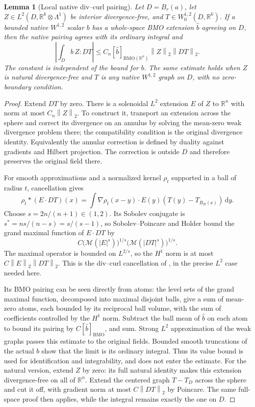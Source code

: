 \documentclass[11pt,a4paper]{article}
\numberwithin{equation}{section}
\newtheorem{lemma}[theorem]{Lemma}
\theoremstyle{definition}
\theoremstyle{remark}
\newcommand{\R}{\mathbb R}
\newcommand{\dd}{\,\mathrm d}
\newcommand{\BMO}{\mathrm{BMO}}
\newcommand{\norm}[1]{\left\lVert#1\right\rVert}
\begin{document}
\begin{lemma}[Local native div--curl pairing]\label{lem:divcurl}
Let $D=B_r(a)$, let $Z\in L^2(D,\R^k\otimes\Lambda^1)$ be
interior divergence-free, and $T\in W^{1,2}_0(D,\R^k)$.
If a bounded native $W^{1,2}$ scalar $b$ has a whole-space BMO extension
$\widehat b$ agreeing on $D$, then the native pairing agrees with its
ordinary integral and
\begin{equation}\label{eq:clms}
 \left|\int_D b\,Z:DT\right|
 \leq C_n[\widehat b]_{\BMO(\R^n)}\norm Z_2\norm{DT}_2.
\end{equation}
The constant is independent of the bound for $b$.
The same estimate holds when $Z$ is natural divergence-free and $T$
is any native $W^{1,2}$ graph on $D$, with no zero-boundary condition.
\end{lemma}
\begin{proof}
Extend $DT$ by zero. There is a solenoidal $L^2$ extension $E$ of $Z$
to $\R^n$ with norm at most $C_n\norm Z_2$. To construct it,
transport an extension across the sphere and correct its divergence on
an annulus by solving the mean-zero weak divergence problem there;
the compatibility condition is the original divergence identity.
Equivalently the annular correction is defined by duality against
gradients and Hilbert projection. The correction is outside $D$ and
therefore preserves the original field there.

For smooth approximations and a normalized kernel $\rho_t$ supported
in a ball of radius $t$, cancellation gives
\[
 \rho_t*(E\cdot DT)(x)
 =\int \nabla\rho_t(x-y)\cdot E(y)
                    (T(y)-T_{B_{2t}(x)})\dd y.
\]
Choose $s=2n/(n+1)\in(1,2)$. Its Sobolev conjugate is
$s^*=ns/(n-s)=s/(s-1)$, so Sobolev--Poincare and Holder bound the grand
maximal function of $E\cdot DT$ by
\[
 C\bigl(\mathcal M(|E|^s)\bigr)^{1/s}
   \bigl(\mathcal M(|DT|^s)\bigr)^{1/s}.
\]
The maximal operator is bounded on $L^{2/s}$, so the $H^1$ norm is at
most $C\norm E_2\norm{DT}_2$. This is the div--curl cancellation of
\cite{CLMS}, in the precise $L^2$ case needed here.

Its BMO pairing can be seen directly from atoms: the level sets of
the grand maximal function, decomposed into maximal disjoint balls,
give a sum of mean-zero atoms, each bounded by its reciprocal ball
volume, with the sum of coefficients controlled by the $H^1$ norm.
Subtract the ball mean of $\widehat b$ on each atom to bound its pairing
by $C[\widehat b]_{\BMO}$, and sum. Strong $L^2$ approximation of
the weak graphs passes this estimate to the original fields. Bounded
smooth truncations of the actual $b$ show that the limit is its ordinary
integral. Thus its value bound is used for identification and
integrability, and does not enter the estimate.
For the natural version, extend $Z$ by zero: its full natural identity
makes this extension divergence-free on all of $\R^n$. Extend the
centered graph $T-T_D$ across the sphere and cut it off, with gradient
norm at most $C\norm{DT}_2$ by Poincare. The same full-space proof
then applies, while the integral remains exactly the one on $D$.
\end{proof}
\end{document}
